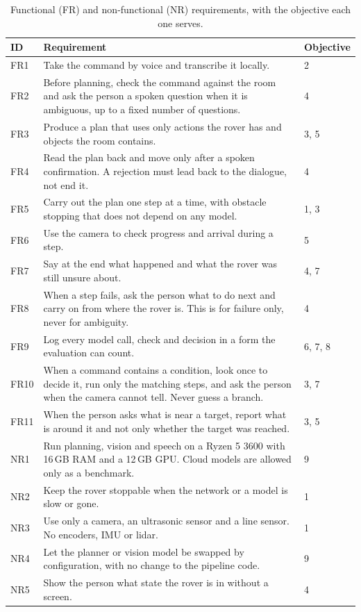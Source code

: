 \begin{table}[htbp]
  \centering
  \caption{Functional (FR) and non-functional (NR) requirements, with the objective each one serves.}
  \label{tab:requirements}
  \small
  \begin{tabular}{@{}l p{9.4cm} l@{}}
    \toprule
    ID & Requirement & Objective \\
    \midrule
    FR1 & Take the command by voice and transcribe it locally. & 2 \\
    FR2 & Before planning, check the command against the room and ask the person a spoken question when it is ambiguous, up to a fixed number of questions. & 4 \\
    FR3 & Produce a plan that uses only actions the rover has and objects the room contains. & 3, 5 \\
    FR4 & Read the plan back and move only after a spoken confirmation. A rejection must lead back to the dialogue, not end it. & 4 \\
    FR5 & Carry out the plan one step at a time, with obstacle stopping that does not depend on any model. & 1, 3 \\
    FR6 & Use the camera to check progress and arrival during a step. & 5 \\
    FR7 & Say at the end what happened and what the rover was still unsure about. & 4, 7 \\
    FR8 & When a step fails, ask the person what to do next and carry on from where the rover is. This is for failure only, never for ambiguity. & 4 \\
    FR9 & Log every model call, check and decision in a form the evaluation can count. & 6, 7, 8 \\
    FR10 & When a command contains a condition, look once to decide it, run only the matching steps, and ask the person when the camera cannot tell. Never guess a branch. & 3, 7 \\
    FR11 & When the person asks what is near a target, report what is around it and not only whether the target was reached. & 3, 5 \\
    NR1 & Run planning, vision and speech on a Ryzen 5 3600 with 16\,GB RAM and a 12\,GB GPU. Cloud models are allowed only as a benchmark. & 9 \\
    NR2 & Keep the rover stoppable when the network or a model is slow or gone. & 1 \\
    NR3 & Use only a camera, an ultrasonic sensor and a line sensor. No encoders, IMU or lidar. & 1 \\
    NR4 & Let the planner or vision model be swapped by configuration, with no change to the pipeline code. & 9 \\
    NR5 & Show the person what state the rover is in without a screen. & 4 \\
    \bottomrule
  \end{tabular}
\end{table}

